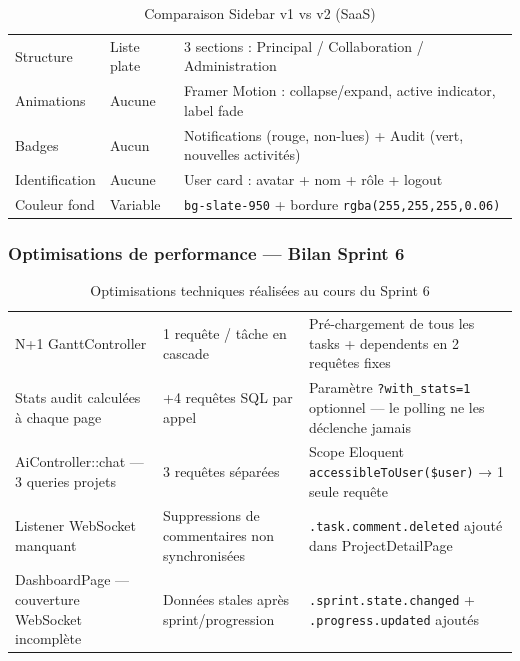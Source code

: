 \begin{table}[H]
  \centering
  \caption{Comparaison Sidebar v1 vs v2 (SaaS)}
  \label{tab:sidebar_compare}
  \begin{tabularx}{\textwidth}{L{3.5cm}L{4cm}X}
    \toprule
     &  &  \\
    \midrule
    Structure       & Liste plate         & 3 sections : Principal / Collaboration / Administration \\
    Animations      & Aucune              & Framer Motion : collapse/expand, active indicator, label fade \\
    Badges          & Aucun               & Notifications (rouge, non-lues) + Audit (vert, nouvelles activités) \\
    Identification  & Aucune              & User card : avatar + nom + rôle + logout \\
    Couleur fond    & Variable            & \texttt{bg-slate-950} + bordure \texttt{rgba(255,255,255,0.06)} \\
    \bottomrule
  \end{tabularx}
\end{table}

\subsubsection{Optimisations de performance — Bilan Sprint 6}

\begin{table}[H]
  \centering
  \caption{Optimisations techniques réalisées au cours du Sprint 6}
  \label{tab:perf_s6}
  \begin{tabularx}{\textwidth}{L{4.5cm}L{3cm}X}
    \toprule
     &  &  \\
    \midrule
    N+1 GanttController & 1 requête / tâche en cascade &
      Pré-chargement de tous les tasks + dependents en 2 requêtes fixes \\
    Stats audit calculées à chaque page &
      +4 requêtes SQL par appel &
      Paramètre \texttt{?with\_stats=1} optionnel — le polling ne les déclenche jamais \\
    AiController::chat — 3 queries projets &
      3 requêtes séparées &
      Scope Eloquent \texttt{accessibleToUser(\$user)} → 1 seule requête \\
    Listener WebSocket manquant &
      Suppressions de commentaires non synchronisées &
      \texttt{.task.comment.deleted} ajouté dans ProjectDetailPage \\
    DashboardPage — couverture WebSocket incomplète &
      Données stales après sprint/progression &
      \texttt{.sprint.state.changed} + \texttt{.progress.updated} ajoutés \\
    \bottomrule
  \end{tabularx}
\end{table}

